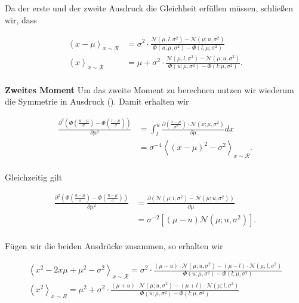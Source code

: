 \documentclass[12pt,a4paper]{scrartcl}
\numberwithin{equation}{section}
\begin{document}
Da der erste und der zweite Ausdruck die Gleichheit erfüllen müssen, schließen wir, dass 

\begin{equation}
 \begin{split}
   \left < x - \mu \right>_{x \sim \mathcal{R}} &= \sigma^2 \cdot \frac{ \mathcal{N}(\mu, l, \sigma^2) - \mathcal{N}(\mu; u, \sigma^2) }{ \Phi(u;\mu,\sigma^2) - \Phi(l;\mu,\sigma^2)} \\
   \left< x \right>_{x \sim \mathcal{R}} &= \mu + \sigma^2 \cdot \frac{ \mathcal{N}(\mu, l, \sigma^2) - \mathcal{N}(\mu; u, \sigma^2) }{ \Phi(u;\mu,\sigma^2) - \Phi(l;\mu,\sigma^2)}. \\
 \end{split}
\end{equation}

\textbf{Zweites Moment	} Um das zweite Moment zu berechnen nutzen wir wiederum die Symmetrie in Ausdruck (). Damit erhalten wir

\begin{equation}
\begin{split}
 \frac{\partial^2 \left (  \Phi \left ( \frac{u- \mu}{\sigma} \right ) - \Phi \left ( \frac{l- \mu}{\sigma} \right ) \right)}{\partial \mu^2} &= \int_l^u \frac{\partial \left ( \frac{x - \mu}{\sigma^2} \right ) \cdot \mathcal{N}(x; \mu, \sigma^2 )}{\partial \mu} dx \\
 &= \sigma^{-4} \left < (x - \mu)^2 - \sigma^2 \right >_{x \sim \mathcal{R}} . \\
\end{split}
\end{equation}

Gleichzeitig gilt

\begin{equation}
\begin{split}
\frac{ \partial^2 \left ( \Phi \left ( \frac{u- \mu}{\sigma} \right )  - \Phi \left ( \frac{u- \mu}{\sigma} \right )  \right )}{ \partial \mu^2} &= \frac{ \partial \left ( \mathcal{N}(\mu; l, \sigma^2) - \mathcal{N}(\mu;u, \sigma^2) \right ) }{ \partial \mu} \\
&= \sigma^{-2} \left [ (\mu - u) \mathcal{N}(\mu;u, \sigma^2) \right ] . \\
\end{split}
\end{equation}

Fügen wir die beiden Ausdrücke zusammen, so erhalten wir 

\begin{equation}
\begin{split}
 \left < x^2 - 2x \mu + \mu^2 - \sigma^2 \right >_{x \sim \mathcal{R}} = \sigma^2 \cdot \frac{(\mu - u) \cdot \mathcal{N}(\mu;u,\sigma^2) - (\mu - l) \cdot \mathcal{N}(\mu;l,\sigma^2)}{\Phi(u; \mu, \sigma^2) - \Phi(l; \mu, \sigma^2)} \\
 \left < x^2 \right >_{x \sim R} = \mu^2 + \sigma^2 \cdot \frac{(\mu + u) \cdot \mathcal{N}(\mu;u,\sigma^2) - (\mu + l) \cdot \mathcal{N}(\mu;l,\sigma^2)}{\Phi(u; \mu, \sigma^2) - \Phi(l; \mu, \sigma^2)} \\
 \end{split}
 \end{equation}
 
\end{document}
